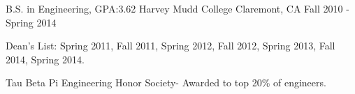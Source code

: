 

\begin{cventries}

  \cventry
    {B.S. in Engineering, GPA:3.62} %
    {Harvey Mudd College} %
    {Claremont, CA} %
    {Fall 2010 - Spring 2014} %
    {
      \begin{cvitems} %
        \item {Dean’s List: Spring 2011, Fall 2011, Spring 2012, Fall 2012, Spring 2013, Fall 2014, Spring 2014.}
        \item {Tau Beta Pi Engineering Honor Society- Awarded to top 20\% of engineers.}
      \end{cvitems}
    }

\end{cventries}
